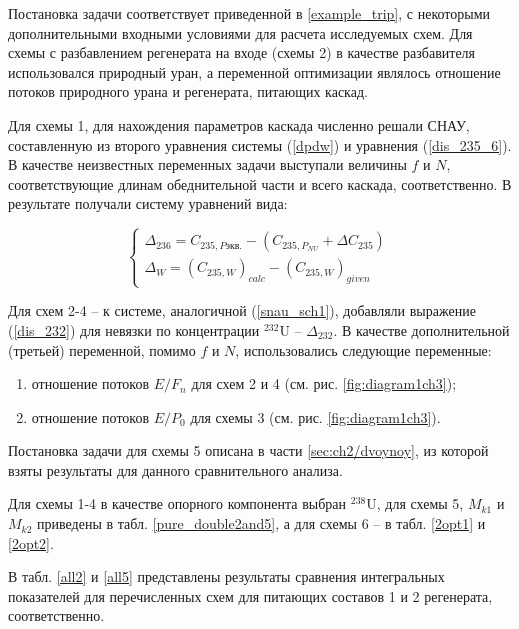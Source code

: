 {Постановка задачи соответствует приведенной в \ref{example_trip}, с некоторыми дополнительными входными условиями для расчета исследуемых схем.
Для схемы с разбавлением регенерата на входе (схемы 2) в качестве разбавителя использовался природный уран, а переменной оптимизации являлось отношение потоков природного урана и регенерата, питающих каскад.

Для схемы 1, для нахождения параметров каскада численно решали СНАУ, составленную из второго уравнения системы (\ref{dpdw}) и уравнения (\ref{dis_235_6}). В качестве неизвестных переменных задачи выступали величины $f$ и $N$, соответствующие длинам обеднительной части и всего каскада, соответственно. В результате получали систему уравнений вида:

\begin{equation}\label{snau_sch1}
  \begin{cases}
  \Delta_{236}=C_{235,P\textit{экв.}}-(C_{235,{P_{NU}}}+\Delta C_{235})\\
  \Delta_{W} = {(C_{235, W})}_{calc}-{(C_{235, W})}_{given}
  \end{cases}\,
\end{equation}

Для схем 2-4 -- к системе, аналогичной (\ref{snau_sch1}), добавляли выражение (\ref{dis_232}) для невязки по концентрации $^{232}$U -- $\Delta_{232}$. В качестве дополнительной (третьей) переменной, помимо $f$ и $N$, использовались следующие переменные:
\begin{enumerate}
    \item отношение потоков $E/{F_n}$ для схем 2 и 4 (см. рис. \ref{fig:diagram1ch3});
    \item отношение потоков $E/{P_0}$ для схемы 3 (см. рис. \ref{fig:diagram1ch3}).
\end{enumerate}

Постановка задачи для схемы 5 описана в части \ref{sec:ch2/dvoynoy}, из которой взяты результаты для данного сравнительного анализа.

Для схемы 1-4 в качестве опорного компонента выбран $^{238}$U, для схемы 5, $M_{k1}$ и $M_{k2}$ приведены в табл. \ref{pure_double2and5}, а для схемы 6 -- в табл. \ref{2opt1} и \ref{2opt2}.

В табл. \ref{all2} и \ref{all5} представлены результаты сравнения интегральных показателей для перечисленных схем для питающих составов 1 и 2 регенерата, соответственно.

}
